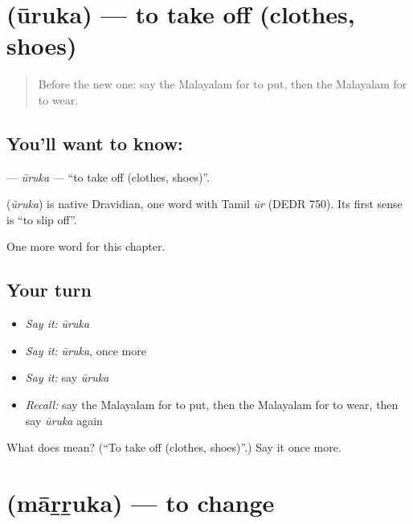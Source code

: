 \section[\texorpdfstring{\ml{ഊരുക} (ūruka)}{ഊരുക (ūruka)}]{ (ūruka) — to take off (clothes, shoes)}

\label{lesson:ML-C223-uruka}



\begin{quote}
Before the new one: say the Malayalam for to put, then the Malayalam for to wear.
\end{quote}

\subsection*{You'll want to know: }
\textbf{} — \emph{ūruka} — \textquotedblleft{}to take off (clothes, shoes)\textquotedblright{}.

\begin{cousinweb}
\textbf{} (\emph{ūruka}) is native Dravidian, one word with Tamil \emph{ūr} (DEDR 750). Its first sense is \textquotedblleft{}to slip off\textquotedblright{}.
\end{cousinweb}

\begin{grammarlens}[title={What you've built}]
One more word for this chapter.
\end{grammarlens}

\subsection*{Your turn}
\begin{itemize}
\raggedright
  \item \emph{Say it:} \emph{ūruka}
  \item \emph{Say it:} \emph{ūruka}, once more
  \item \emph{Say it:} say \emph{ūruka}
  \item \emph{Recall:} say the Malayalam for to put, then the Malayalam for to wear, then say \emph{ūruka} again
\end{itemize}

\begin{tcolorbox}[breakable,colback=teal!4,colframe=teal!35!black,title={Before you move on}]
What does  mean? (\textquotedblleft{}To take off (clothes, shoes)\textquotedblright{}.) Say it once more.
\end{tcolorbox}
\section[\texorpdfstring{\ml{മാറ്റുക} (māṟṟuka)}{മാറ്റുക (māṟṟuka)}]{ (māṟṟuka) — to change}

